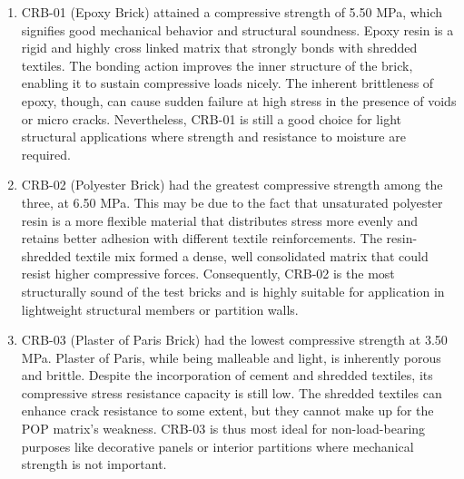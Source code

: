 \begin{enumerate}
	\item CRB-01 (Epoxy Brick) attained a compressive strength of 5.50 MPa, which signifies good mechanical behavior and structural soundness. Epoxy resin is a rigid and highly cross linked matrix that strongly bonds with shredded textiles. The bonding action improves the inner structure of the brick, enabling it to sustain compressive loads nicely. The inherent brittleness of epoxy, though, can cause sudden failure at high stress in the presence of voids or micro cracks. Nevertheless, CRB-01 is still a good choice for light structural applications where strength and resistance to moisture are required.

	\item CRB-02 (Polyester Brick) had the greatest compressive strength among the three, at 6.50 MPa. This may be due to the fact that unsaturated polyester resin is a more flexible material that distributes stress more evenly and retains better adhesion with different textile reinforcements. The resin-shredded textile mix formed a dense, well consolidated matrix that could resist higher compressive forces. Consequently, CRB-02 is the most structurally sound of the test bricks and is highly suitable for application in lightweight structural members or partition walls.

	\item CRB-03 (Plaster of Paris Brick) had the lowest compressive strength at 3.50 MPa. Plaster of Paris, while being malleable and light, is inherently porous and brittle. Despite the incorporation of cement and shredded textiles, its compressive stress resistance capacity is still low. The shredded textiles can enhance crack resistance to some extent, but they cannot make up for the POP matrix's weakness. CRB-03 is thus most ideal for non-load-bearing purposes like decorative panels or interior partitions where mechanical strength is not important.
\end{enumerate}

